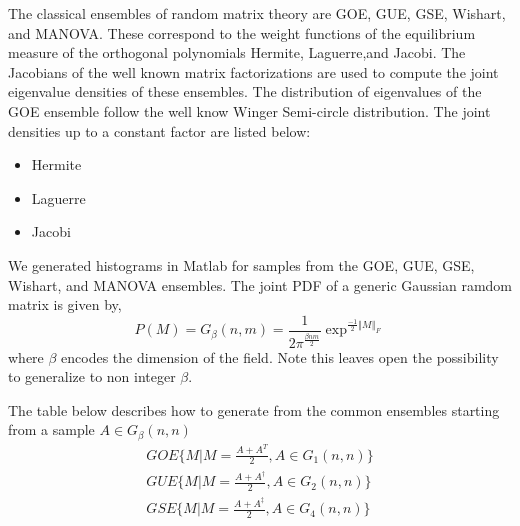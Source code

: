 \documentclass[a4paper]{article}
\newcommand{\norm}[1]{\left\Vert#1\right\Vert}
\theoremstyle{plain}
\theoremstyle{definition}
\theoremstyle{remark}
\numberwithin{equation}{section}
\begin{document}
The classical ensembles of random matrix theory are GOE, GUE, GSE, Wishart, and MANOVA. These correspond to the weight functions of the equilibrium measure of the orthogonal polynomials Hermite, Laguerre,and Jacobi.  The Jacobians of the well known matrix factorizations are used to compute the joint eigenvalue densities of these ensembles. The distribution of eigenvalues of the GOE ensemble follow the well know Winger Semi-circle distribution.
The joint densities up to a constant factor are listed below:
\begin{itemize}
  \item Hermite  \item Laguerre   \item Jacobi
\end{itemize}
We generated histograms in Matlab for samples from the GOE, GUE, GSE, Wishart, and MANOVA ensembles.
The joint PDF of a generic Gaussian ramdom matrix is given by,
\begin{equation*}
P(M)=G_\beta(n,m)=\frac{1}{2 \pi^{\frac{\beta n m}{2} }} \exp^{\frac{-1}{2}\norm{M}_F }
\end{equation*} where $\beta$ encodes the dimension of the field.  Note this leaves open the possibility to
generalize to non integer $\beta$.

The table below describes how to generate from the common ensembles starting from a sample $A \in G_\beta(n,n)$
\begin{eqnarray*}
    GOE  \{ M | M = \frac{A+A^T}{2}, A \in G_1(n,n)\}\\ %
    GUE  \{ M | M = \frac{A+A^\dagger}{2}, A \in G_2(n,n)\}\\ %
    GSE  \{ M | M = \frac{A+A^\ddagger}{2}, A \in G_4(n,n)\} %
\end{eqnarray*}
\end{document}
